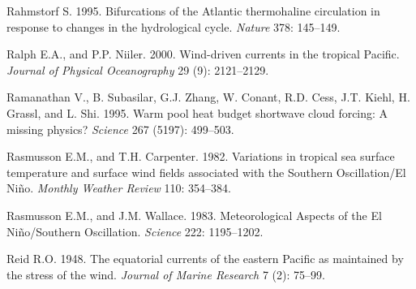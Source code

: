 \begin{thebibliography}{999}
Rahmstorf S.  1995. Bifurcations of the Atlantic thermohaline
circulation in response to changes in the hydrological
cycle. \textit{Nature} 378: 145--149.
%

Ralph E.A., and P.P. Niiler.  2000. Wind-driven currents in the
tropical Pacific. \textit{Journal of Physical Oceanography} 29 (9):
2121--2129.
%

Ramanathan V., B. Subasilar, G.J. Zhang, W. Conant, R.D. Cess,
J.T. Kiehl, H. Grassl, and L. Shi. 1995. Warm pool heat budget
shortwave cloud forcing: A missing physics? \textit{Science} 267
(5197): 499--503.
%

Rasmusson E.M., and T.H. Carpenter.  1982. Variations in tropical sea
surface temperature and surface wind fields associated with the
Southern Oscillation/El Ni\~{n}o. \textit{Monthly Weather Review} 110:
354--384.
%

Rasmusson E.M., and J.M. Wallace.  1983. Meteorological Aspects of the
El Ni\~{n}o/Southern Oscillation. \textit{Science} 222: 1195--1202.
%

Reid R.O.  1948. The equatorial currents of the eastern Pacific as
maintained by the stress of the wind. \textit{Journal of Marine
  Research} 7 (2): 75--99.
%


\end{thebibliography}
